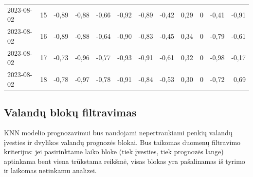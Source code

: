 \documentclass[]{VUMIFTemplateClass}
\begin{document}
\begin{table}[H]
{\begin{tabular}{|l|c|r|r|r|r|r|r|r|c|r|r|}
                2023-08-02    & 15            & -0,89            & -0,88            & -0,66             & -0,92                 & -0,89                  & -0,42             & 0,29           & 0                    & -0,41                & -0,91                \\
                2023-08-02    & 16            & -0,89            & -0,88            & -0,64             & -0,90                 & -0,83                  & -0,45             & 0,34           & 0                    & -0,79                & -0,61                \\
                2023-08-02    & 17            & -0,73            & -0,96            & -0,77             & -0,93                 & -0,91                  & -0,61             & 0,32           & 0                    & -0,98                & -0,17                \\
                2023-08-02    & 18            & -0,78            & -0,97            & -0,78             & -0,91                 & -0,84                  & -0,53             & 0,30           & 0                    & -0,72                & 0,69                 \\
                \hline
            \end{tabular}
        }
        \label{tab:normalized_missing_data}
    \end{table}

    \subsection{Valandų blokų filtravimas}
    KNN modelio prognozavimui bus naudojami nepertraukiami penkių valandų įvesties ir dvylikos valandų prognozės blokai.
    Bus taikomas duomenų filtravimo kriterijus: jei pasirinktame laiko bloke (tiek įvesties, tiek prognozės lange) aptinkama bent viena trūkstama reikšmė, visas blokas yra pašalinamas iš tyrimo ir laikomas netinkamu analizei.

    \printbibliography[title = {Literatūra ir šaltiniai}]
\end{document}
